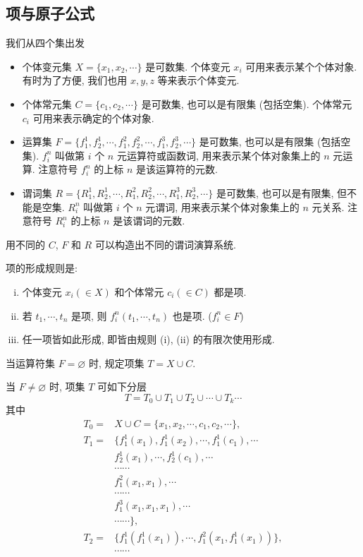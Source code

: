 \documentclass[
    color=black,
    device=normal,
    lang=cn
]{elegantnote}
\begin{document}
\subsection{项与原子公式}
我们从四个集出发
\begin{itemize}[listparindent = 2em]
    \item 个体变元集 $X=\{x_1, x_2, \cdots\}$ 是可数集. 个体变元 $x_i$ 可用来表示某个个体对象. 有时为了方便, 我们也用 $x, y, z$ 等来表示个体变元.
    \item 个体常元集 $C=\{c_1, c_2, \cdots\}$ 是可数集, 也可以是有限集 (包括空集). 个体常元 $c_i$ 可用来表示确定的个体对象.
    \item 运算集 $F=\{f_1^1, f_2^1, \cdots, f_1^2, f_2^2, \cdots, f_1^3, f_2^3, \cdots\}$ 是可数集, 也可以是有限集 (包括空集).
          $f_i^n$ 叫做第 $i$ 个 $n$ 元运算符或函数词, 用来表示某个体对象集上的 $n$ 元运算. 注意符号 $f_i^n$ 的上标 $n$ 是该运算符的元数.
    \item 谓词集 $R=\{R_1^1, R_2^1, \cdots, R_1^2, R_2^2, \cdots, R_1^3, R_2^3, \cdots\}$ 是可数集, 也可以是有限集, 但不能是空集.
          $R_i^n$ 叫做第 $i$ 个 $n$ 元谓词, 用来表示某个体对象集上的 $n$ 元关系. 注意符号 $R_i^n$ 的上标 $n$ 是该谓词的元数.
\end{itemize}
用不同的 $C$, $F$ 和 $R$ 可以构造出不同的谓词演算系统.
\begin{definition}[项集 $T$]
    项的形成规则是:
    \begin{enumerate}[(i)]
        \item 个体变元 $x_i (\in X)$ 和个体常元 $c_i (\in C)$ 都是项.
        \item 若 $t_1, \cdots, t_n$ 是项, 则 $f_i^n(t_1, \cdots, t_n)$ 也是项. ($f_i^n\in F$)
        \item 任一项皆如此形成, 即皆由规则 (i), (ii) 的有限次使用形成.
    \end{enumerate}
    当运算符集 $F=\varnothing$ 时, 规定项集 $T=X\cup C$.
\end{definition}
当 $F\neq \varnothing$ 时, 项集 $T$ 可如下分层
$$
    T=T_0\cup T_1\cup T_2\cup \cdots\cup T_k\cdots
$$
其中
$$
    \begin{aligned}
        T_0 = & X\cup C=\{x_1, x_2, \cdots, c_1, c_2, \cdots\},        \\
        T_1 = & \{f_1^1(x_1), f_1^1(x_2), \cdots, f_1^1(c_1),\cdots    \\
              & f_2^1(x_1), \cdots, f_2^1(c_1), \cdots                 \\
              & \cdots\cdots                                           \\
              & f_1^2(x_1, x_1), \cdots                                \\
              & \cdots\cdots                                           \\
              & f_1^3(x_1, x_1, x_1), \cdots                           \\
              & \cdots\cdots\},                                        \\
        T_2 = & \{f_1^1(f_1^1(x_1)), \cdots, f_1^2(x_1, f_1^1(x_1))\}, \\
              & \cdots\cdots
    \end{aligned}
$$
\end{document}
